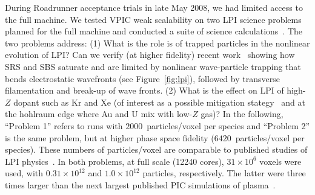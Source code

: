 \documentclass[journal,twoside]{IEEEtran}
\newcommand{\fig}[1]{Figure~\ref{fig:#1}}
\begin{document}
During Roadrunner acceptance trials in late May 2008, we had limited
access to the full machine.  We tested VPIC weak scalability on two
LPI science problems planned for the full machine and conducted a
suite of science calculations~\cite{AAC_Conference_Paper}.  The two
problems
address:
(1) What is the role is of trapped particles in the nonlinear
evolution of LPI?  Can we verify (at higher fidelity) recent
work~\cite{Yin_et_al_PRL_2007_SRS,Yin_et_al_Phys_Plasmas_2007_SRS}
showing how SRS and SBS saturate and are limited by nonlinear
wave-particle trapping that bends electrostatic wavefronts (see
\fig{lpi}), followed by transverse filamentation and break-up
of wave fronts.
(2) What is the effect on LPI of high-$Z$ dopant such as Kr and Xe (of
interest as a possible mitigation stategy~\cite{Lushnikov_PPCF_2006}
and at the hohlraum edge where Au and U mix with low-$Z$ gas)?
In the following, ``Problem 1'' refers to runs with
$2000$~particles/voxel per species and ``Problem 2'' is the same
problem, but at higher phase space fidelity ($6420$~particles/voxel
per species).  These numbers of particles/voxel are comparable to
published studies of LPI
physics~\cite{Yin_et_al_PRL_2007_SRS,Yin_et_al_Phys_Plasmas_2007_SRS}.
In both problems, at full scale (12240 cores), $31 \times 10^6$ voxels
were used, with $0.31 \times 10^{12}$ and $1.0 \times 10^{12}$
particles, respectively.  The latter were three times larger than the
next largest published PIC simulations of
plasma~\cite{Yin_et_al_PRL_2007_reconnection}.


\end{document}
